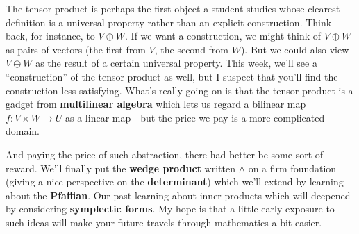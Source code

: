 \documentclass{homework}
\begin{document}
The tensor product is perhaps the first object a student studies whose
clearest definition is a universal property rather than an explicit
construction.  Think back, for instance, to $V \oplus W$.  If we want
a construction, we might think of $V \oplus W$ as pairs of vectors
(the first from $V$, the second from $W$).  But we could also view
$V \oplus W$ as the result of a certain universal property.  This
week, we'll see a ``construction'' of the tensor product as well, but
I suspect that you'll find the construction less satisfying.
What's really going on is that the tensor product is a gadget from
\textbf{multilinear algebra} which lets us regard a bilinear map
$f : V \times W \to U$ as a linear map---but the price we pay is a
more complicated domain.

And paying the price of such abstraction, there had better be some
sort of reward.  We'll finally put the \textbf{wedge product} written
$\wedge$ on a firm foundation (giving a nice perspective on the
\textbf{determinant}) which we'll extend by learning about the
\textbf{Pfaffian}.  Our past learning about inner products which will
deepened by considering \textbf{symplectic forms}.  My hope is that a
little early exposure to such ideas will make your future travels
through mathematics a bit easier.
\end{document}
